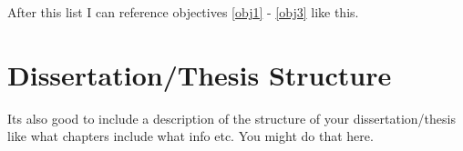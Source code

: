After this list I can reference objectives \ref{obj1} - \ref{obj3} like this.

\section{Dissertation/Thesis Structure}

Its also good to include a description of the structure of your dissertation/thesis
like what chapters include what info etc. You might do that here.

\singlespacing


\doublespacing
